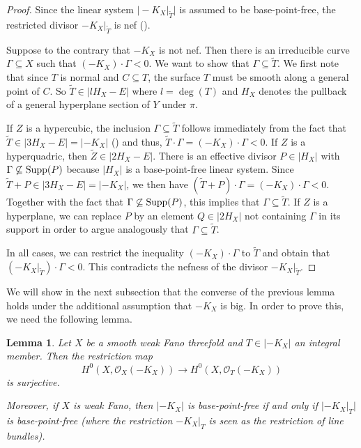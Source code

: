 \documentclass[english,11pt,reqno]{amsart}
\newcommand{\sub}{\subseteq}
\newcommand{\supp}{\textup{Supp}}
\newtheorem{lem}[thm]{Lemma}
\begin{document}
\begin{proof}
Since the linear system $\big|-K_X|_{\widetilde{T}}\big|$ is assumed to be base-point-free, the restricted divisor $-K_X|_{\widetilde{T}}$ is nef (). \par 
Suppose to the contrary that $-K_X$ is not nef. Then there is an irreducible curve $\Gamma \sub X$ such that $(-K_X)\cdot \Gamma <0$. We want to show that $\Gamma \sub \widetilde{T}$. We first note that since $T$ is normal and $C\sub T$, the surface $T$ must be smooth along a general point of $C$. So $\widetilde{T}\in |lH_X-E|$ where $l=\deg(T)$ and $H_X$ denotes the pullback of a general hyperplane section of $Y$ under $\pi$. \par 
If $Z$ is a hypercubic, the inclusion $\Gamma \sub \widetilde{T}$ follows immediately from the fact that $\widetilde{T}\in |3H_X-E|=|-K_X|$ () and thus, $\widetilde{T} \cdot \Gamma= (-K_X)\cdot \Gamma <0$. If $Z$ is a hyperquadric, then $\widetilde{Z}\in |2H_X-E|$. There is an effective divisor $P\in |H_X|$ with $\Gamma \not \sub \supp(P)$ because $|H_X|$ is a base-point-free linear system. Since $\widetilde{T}+P \in |3H_X-E|= |-K_X|$, we then have $(\widetilde{T}+P)\cdot \Gamma= (-K_X)\cdot \Gamma <0$. Together with the fact that $\Gamma \not \sub \supp(P)$, this implies that $\Gamma \sub \widetilde{T}$. If $Z$ is a hyperplane, we can replace $P$ by an element $Q\in|2H_X|$ not containing $\Gamma$ in its support in order to argue analogously that $\Gamma \sub \widetilde{T}$.\par 
In all cases, we can restrict the inequality $(-K_X)\cdot \Gamma$ to $\widetilde{T}$ and obtain that $(-K_X|_{\widetilde{T}})\cdot \Gamma <0$. This contradicts the nefness of the divisor $-K_X|_{\widetilde{T}}$.
\end{proof}
%
We will show in the next subsection that the converse of the previous lemma holds under the additional assumption that $-K_X$ is big. In order to prove this, we need the following lemma. 
%
\begin{lem} \label{lem:bpf_iff_restriction_bpf}
Let $X$ be a smooth weak Fano threefold and $T\in |-K_X|$ an integral member. Then the restriction map 
$$ H^0(X, \mathcal{O}_X(-K_X)) \rightarrow H^0(X,\mathcal{O}_T(-K_X))$$
is surjective. \par
Moreover, if $X$ is weak Fano, then $|-K_X|$ is base-point-free if and only if $|-K_X|_T|$ is base-point-free (where the restriction $-K_X|_T$ is seen as the restriction of line bundles).
\end{lem}
\end{document}
